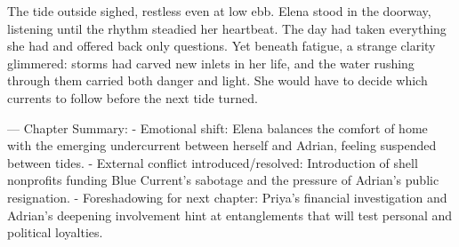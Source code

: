 The tide outside sighed, restless even at low ebb. Elena stood in the doorway, listening until the rhythm steadied her heartbeat. The day had taken everything she had and offered back only questions. Yet beneath fatigue, a strange clarity glimmered: storms had carved new inlets in her life, and the water rushing through them carried both danger and light. She would have to decide which currents to follow before the next tide turned.

\bigskip

---
Chapter Summary:
- Emotional shift: Elena balances the comfort of home with the emerging undercurrent between herself and Adrian, feeling suspended between tides.
- External conflict introduced/resolved: Introduction of shell nonprofits funding Blue Current's sabotage and the pressure of Adrian's public resignation.
- Foreshadowing for next chapter: Priya's financial investigation and Adrian's deepening involvement hint at entanglements that will test personal and political loyalties.

